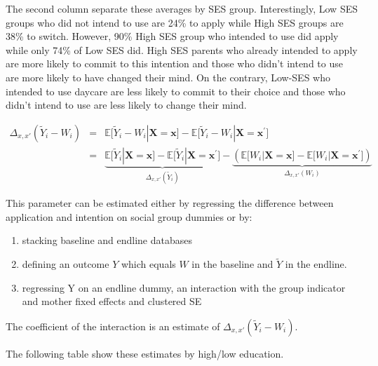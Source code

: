 \documentclass[
]{article}
\providecommand{\tightlist}{%
  \setlength{\itemsep}{0pt}\setlength{\parskip}{0pt}}
\newcommand{\espb}[1]{\mathds{E}\Big[ #1 \Big]}
\begin{document}
The second column separate these averages by SES group. Interestingly, Low SES groups who did not intend to use are 24\% to apply while High SES groups are 38\% to switch.
However, 90\% High SES group who intended to use did apply while only 74\% of Low SES did.
High SES parents who already intended to apply are more likely to commit to this intention and those who didn't intend to use are more likely to have changed their mind.
On the contrary, Low-SES who intended to use daycare are less likely to commit to their choice and those who didn't intend to use are less likely to change their mind.

\begin{align}
\Delta_{x,x'}(\tilde{Y}_i-W_i) &=& \espb{\tilde{Y}_i-W_i|\mathbf{X}=\mathbf{x}}-\espb{\tilde{Y}_i-W_i|\mathbf{X}=\mathbf{x^\prime}}\\
&=&  \underbrace{\espb{\tilde{Y}_i|\mathbf{X}=\mathbf{x}}-\espb{\tilde{Y}_i|\mathbf{X}=\mathbf{x^\prime}}}_{\Delta_{x,x'}(\tilde{Y}_i)}-\underbrace{\left(\espb{W_i|\mathbf{X}=\mathbf{x}}-\espb{W_i|\mathbf{X}=\mathbf{x^\prime}}\right)}_{\Delta_{x,x'}(W_i)}
\end{align}

This parameter can be estimated either by regressing the difference between application and intention on social group dummies or by:

\begin{enumerate}
\def\labelenumi{\arabic{enumi})}
\tightlist
\item
  stacking baseline and endline databases
\item
  defining an outcome \(Y\) which equals \(W\) in the baseline and \(\tilde{Y}\) in the endline.
\item
  regressing Y on an endline dummy, an interaction with the group indicator and mother fixed effects and clustered SE
\end{enumerate}

The coefficient of the interaction is an estimate of \(\Delta_{x,x'}(\tilde{Y}_i-W_i)\).

The following table show these estimates by high/low education.
\end{document}
